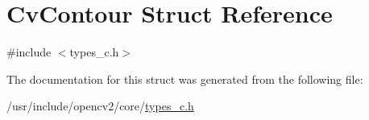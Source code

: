 \hypertarget{structCvContour}{\section{Cv\-Contour Struct Reference}
\label{structCvContour}
}


{\ttfamily \#include $<$types\-\_\-c.\-h$>$}



The documentation for this struct was generated from the following file\-:\begin{DoxyCompactItemize}
\item 
/usr/include/opencv2/core/\hyperlink{core_2types__c_8h}{types\-\_\-c.\-h}\end{DoxyCompactItemize}
